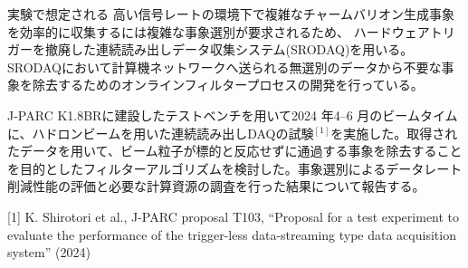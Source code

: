 \documentclass[12pt,a4paper,upLaTeX]{jsarticle}
\begin{document}
実験で想定される
高い信号レートの環境下で複雑なチャームバリオン生成事象を効率的に収集するには複雑な事象選別が要求されるため、
ハードウェアトリガーを撤廃した連続読み出しデータ収集システム(SRODAQ)を用いる。
SRODAQにおいて計算機ネットワークへ送られる無選別のデータから不要な事象を除去するためのオンラインフィルタープロセスの開発を行っている。

J-PARC K1.8BRに建設したテストベンチを用いて2024 年4--6 月のビームタイムに、ハドロンビームを用いた連続読み出しDAQの試験$^{\left[1\right]}$を実施した。取得されたデータを用いて、ビーム粒子が標的と反応せずに通過する事象を除去することを目的としたフィルターアルゴリズムを検討した。事象選別によるデータレート削減性能の評価と必要な計算資源の調査を行った結果について報告する。

[1] K. Shirotori et al., J-PARC proposal T103, “Proposal for a test experiment to evaluate the
performance of the trigger-less data-streaming type data acquisition system” (2024)

\end{document}
